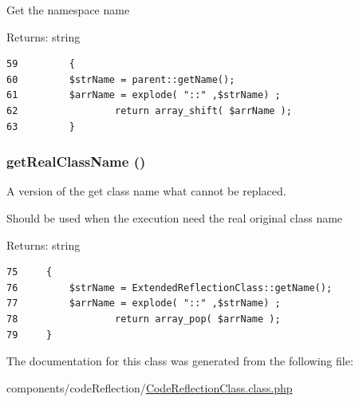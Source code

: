 Get the namespace name

\begin{Desc}
\item[Returns:]string \end{Desc}


\begin{Code}\begin{verbatim}59         {
60         $strName = parent::getName();
61         $arrName = explode( "::" ,$strName) ;
62                 return array_shift( $arrName );
63         }
\end{verbatim}
\end{Code}


\hypertarget{class_code_reflection_class_a56c2962a9dd11f78bdafb688f9cd8fa}{
\subsubsection[{getRealClassName}]{\setlength{\rightskip}{0pt plus 5cm}getRealClassName ()}}
\label{class_code_reflection_class_a56c2962a9dd11f78bdafb688f9cd8fa}


A version of the get class name what cannot be replaced.

Should be used when the execution need the real original class name

\begin{Desc}
\item[Returns:]string \end{Desc}


\begin{Code}\begin{verbatim}75     {
76         $strName = ExtendedReflectionClass::getName();
77         $arrName = explode( "::" ,$strName) ;
78                 return array_pop( $arrName );
79     }
\end{verbatim}
\end{Code}




The documentation for this class was generated from the following file:\begin{CompactItemize}
\item 
components/codeReflection/\hyperlink{_code_reflection_class_8class_8php}{CodeReflectionClass.class.php}\end{CompactItemize}
